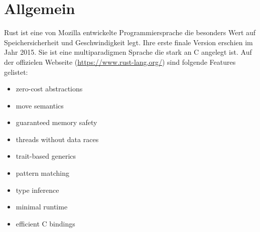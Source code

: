 \section{Allgemein}
Rust ist eine von Mozilla entwickelte Programmiersprache die besonders Wert auf Speichersicherheit und Geschwindigkeit legt. Ihre erste finale Version erschien im Jahr 2015.
Sie ist eine multiparadigmen Sprache die stark an C angelegt ist.
Auf der offizielen Webseite (\url{https://www.rust-lang.org/}) sind folgende Features gelistet:

\begin{itemize}	
\item zero-cost abstractions
\item move semantics
\item guaranteed memory safety
\item threads without data races
\item trait-based generics
\item pattern matching
\item type inference
\item minimal runtime
\item efficient C bindings
\end{itemize}





